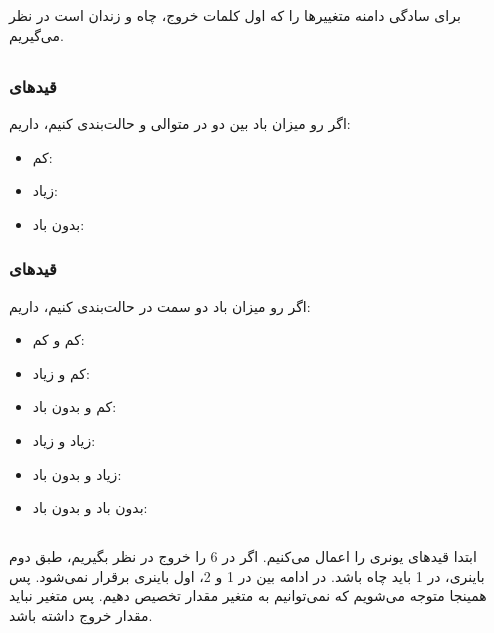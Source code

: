 \documentclass{university}
\begin{document}
\setupdocument

\section{}
برای سادگی دامنه متغییرها را 
که اول کلمات خروج، چاه و زندان است در نظر می‌گیریم.

\subsection{}
\subsubsection{قیدهای }
اگر رو میزان باد بین دو در متوالی
و
حالت‌بندی کنیم، داریم:
\begin{itemize}
    \item کم: 
    \item زیاد: 
    \item بدون باد: 
\end{itemize}

\subsubsection{قیدهای }
اگر رو میزان باد دو سمت در 
حالت‌بندی کنیم، داریم:
\begin{itemize}
    \item کم و کم: 
    \item کم و زیاد: 
    \item کم و بدون باد: 
    \item زیاد و زیاد: 
    \item زیاد و بدون باد: 
    \item بدون باد و بدون باد: 
\end{itemize}

\subsection{}
ابتدا قیدهای یونری را اعمال می‌کنیم. اگر در 6 را خروج در نظر بگیریم، طبق 
دوم باینری، در 1 باید چاه باشد. در ادامه بین در 1 و 2، 
اول باینری برقرار نمی‌شود. پس همینجا متوجه می‌شویم که نمی‌توانیم به متغیر 
مقدار تخصیص دهیم. پس متغیر 
نباید مقدار خروج داشته باشد.
\end{document}
